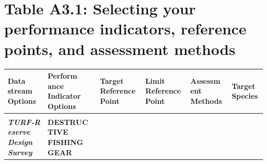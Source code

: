 \documentclass[]{book}
\begin{document}
\section{Table A3.1: Selecting your performance indicators, reference
points, and assessment
methods}\label{table-a3.1-selecting-your-performance-indicators-reference-points-and-assessment-methods}

\begin{longtable}[]{@{}llllll@{}}
\toprule
\begin{minipage}[b]{0.14\columnwidth}\raggedright\strut
\textbf{Data stream Options}\strut
\end{minipage} & \begin{minipage}[b]{0.14\columnwidth}\raggedright\strut
\textbf{Perform ance Indicator Options}\strut
\end{minipage} & \begin{minipage}[b]{0.14\columnwidth}\raggedright\strut
\textbf{Target Reference Point}\strut
\end{minipage} & \begin{minipage}[b]{0.14\columnwidth}\raggedright\strut
\textbf{Limit Reference Point}\strut
\end{minipage} & \begin{minipage}[b]{0.14\columnwidth}\raggedright\strut
\textbf{Assessm ent Methods}\strut
\end{minipage} & \begin{minipage}[b]{0.14\columnwidth}\raggedright\strut
\textbf{Target Species}\strut
\end{minipage}\tabularnewline
\midrule
\endhead
\begin{minipage}[t]{0.14\columnwidth}\raggedright\strut
\strut
\end{minipage} & \begin{minipage}[t]{0.14\columnwidth}\raggedright\strut
\strut
\end{minipage} & \begin{minipage}[t]{0.14\columnwidth}\raggedright\strut
\strut
\end{minipage} & \begin{minipage}[t]{0.14\columnwidth}\raggedright\strut
\strut
\end{minipage} & \begin{minipage}[t]{0.14\columnwidth}\raggedright\strut
\strut
\end{minipage} & \begin{minipage}[t]{0.14\columnwidth}\raggedright\strut
\strut
\end{minipage}\tabularnewline
\begin{minipage}[t]{0.16\columnwidth}\raggedright\strut
\textbf{\emph{TURF-R eserve Design Survey}}\strut
\end{minipage} & \begin{minipage}[t]{0.16\columnwidth}\raggedright\strut
\textbf{DESTRUC TIVE FISHING GEAR}


\end{minipage}
\end{longtable}
\end{document}
